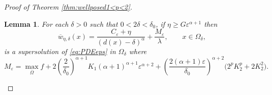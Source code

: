 \documentclass[11pt,reqno]{amsart}
\numberwithin{figure}{section}
\theoremstyle{plain}
\newtheorem{lem}[thm]{Lemma}
\theoremstyle{remark}
\numberwithin{equation}{section}
\begin{document}
\begin{appendices}
\begin{proof} [Proof of Theorem \ref{thm:wellposed1<p<2}]
\begin{lem}\label{lem:subsln} For each $\delta > 0$ such that $0<2\delta < \delta_0$, if $\eta\geq G\varepsilon^{\alpha+1}$ then
\begin{equation*}
    \overline{w}_{\eta,\delta}(x) = \frac{C_\varepsilon+\eta}{(d(x)-\delta)^\alpha} +\frac{M_\varepsilon}{\lambda},\qquad x\in \Omega_\delta, 
\end{equation*}
is a supersolution of \eqref{eq:PDEeps} in $\Omega_\delta$ where
\begin{equation}\label{e:M_eps}
    M_\varepsilon = \max_{\overline{\Omega}} f + 2\left(\frac{2}{\delta_0}\right)^{\alpha+1}K_1(\alpha+1)^{\alpha+1}\varepsilon^{\alpha+2} + \left(\frac{2(\alpha+1)\varepsilon}{\delta_0}\right)^{\alpha+2}\big(2^pK_2^p+2K_2^2\big).
\end{equation}
\end{lem}


\end{proof}
\end{appendices}
\end{document}

